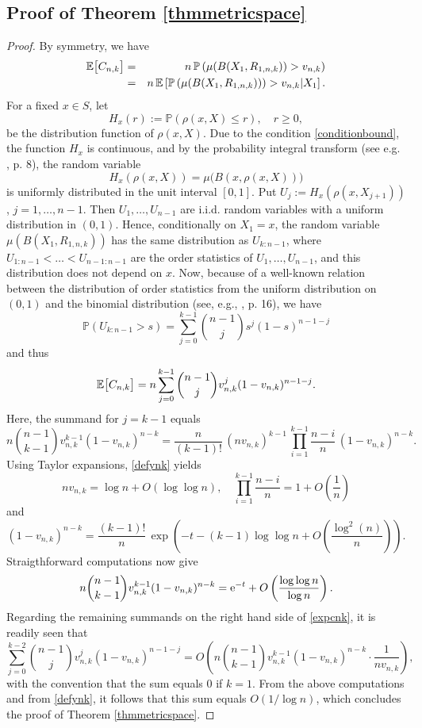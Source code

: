 \documentclass{article}
\theoremstyle{thm}
\theoremstyle{definition}
\theoremstyle{definition}
\theoremstyle{def}
\begin{document}
\subsection{Proof of Theorem \ref{thmmetricspace}}
\begin{proof}
By symmetry, we have
\begin{eqnarray*}
\mathbb{E} \big{[}C_{n,k}\big{]} & =  & n\,  \mathbb{P} \left( \mu (B(X_1,R_{1,n,k})) > v_{n,k} \right)\\
& = & n \, \mathbb{E} \left[ \mathbb{P} \left( \mu(B(X_1,R_{1,n,k}))\right) > v_{n,k}|X_1  \right].
\end{eqnarray*}
For a fixed $x \in S$, let
\[%
H_x(r):=\mathbb{P} \left(\rho(x,X) \le r\right), \quad r \ge 0,
\]%
be the distribution function of $\rho(x,X)$. Due to the condition \eqref{conditionbound}, the function $H_x$ is continuous,
and by the probability integral transform (see e.g. \cite{BD15}, p. 8),
the random variable
\[
H_x(\rho(x,X)) = \mu \big( B(x,\rho(x,X))\big)
\]
is uniformly distributed in the unit interval $[0,1]$.
Put $U_j := H_x(\rho(x,X_{j+1}))$, $j=1,\ldots,n-1$. Then $U_1,\ldots,U_{n-1}$ are i.i.d. random variables with
a uniform distribution in $(0,1)$. Hence, conditionally on $X_1=x$, the random variable $\mu (B(X_1,R_{1,n,k}))$ has the same distribution as
$U_{k:n-1}$, where $U_{1:n-1} < \ldots < U_{n-1:n-1}$ are the order statistics of $U_1,\ldots,U_{n-1}$, and this distribution does not depend on $x$.
Now, because of a well-known relation between the distribution   of order statistics from the uniform distribution on $(0,1)$ and the binomial distribution (see, e.g., \cite{ANS}, p. 16),
we have
\[
\mathbb{P}(U_{k:n-1} > s) = \sum_{j=0}^{k-1} {n-1 \choose j} s^j (1-s)^{n-1-j}
\]
and thus
\begin{equation}\label{expcnk}
\mathbb{E} \big{[}C_{n,k}\big{]} = n \sum_{j=0}^{k-1} {n-1 \choose j} v_{n,k}^j (1-v_{n,k})^{n-1-j}.
\end{equation}
Here, the summand for $j=k-1$ equals
\[n {n-1 \choose k-1} v_{n,k}^{k-1} (1-v_{n,k})^{n-k} = \frac{n}{(k-1)!}\, (nv_{n,k})^{k-1}\, \prod_{i=1}^{k-1}\frac{n-i}{n}\, (1-v_{n,k})^{n-k}.\]
Using Taylor expansions, \eqref{defynk} yields
 \[nv_{n,k}  = \log n+O\left(\log\log n\right), \quad
 \prod_{i=1}^{k-1}\frac{n-i}{n} = 1+O\left(  \frac{1}{n}\right)
 \]
 and
\[
(1-v_{n,k})^{n-k} = \frac{(k-1)!}{n}\, \exp\left(-t-(k-1)\log\log n+O\left( \frac{\log^2(n)}{n}  \right)\right).
\]
Straigthforward computations now give
\[n {n-1 \choose k-1} v_{n,k}^{k-1} (1-v_{n,k})^{n-k}  = {\rm e}^{-t}+O\left( \frac{\log\log n}{\log n}  \right).\]
Regarding the remaining summands on the right hand side of \eqref{expcnk}, it is readily seen that
\[
\sum_{j=0}^{k-2} {n-1 \choose j} v_{n,k}^j (1-v_{n,k})^{n-1-j} = O\left( n {n-1 \choose k-1} v_{n,k}^{k-1} (1-v_{n,k})^{n-k} \cdot \frac{1}{nv_{n,k}}  \right),
\] with the convention that the sum equals 0 if $k=1$. From the above computations and from  \eqref{defynk}, it follows that this sum
equals $O\left(1/\log n \right)$, which concludes the proof of Theorem \ref{thmmetricspace}.
\end{proof}
\end{document}

